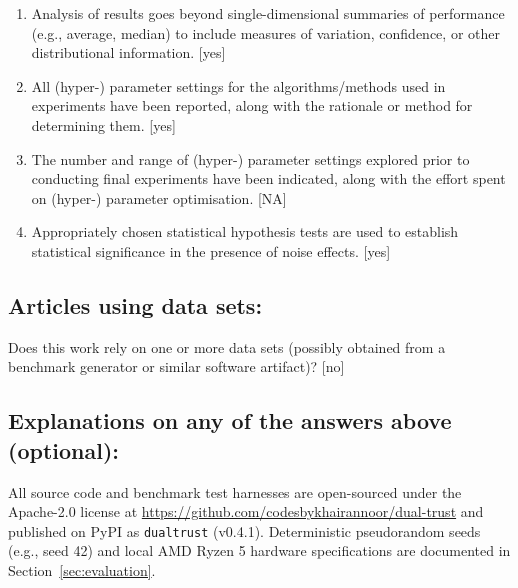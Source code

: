 \documentclass[manuscript, screen, review]{jair}
\begin{document}
\begin{enumerate}
    [yes]
    \item Analysis of results goes beyond single-dimensional summaries of performance (e.g., average, median) to include measures of variation, confidence, or other distributional information. 
    [yes]
    \item All (hyper-) parameter settings for the algorithms/methods used in experiments have been reported, along with the rationale or method for determining them. 
    [yes]
    \item The number and range of (hyper-) parameter settings explored prior to conducting final experiments have been indicated, along with the effort spent on (hyper-) parameter optimisation. 
    [NA]
    \item Appropriately chosen statistical hypothesis tests are used to establish statistical significance in the presence of noise effects.
    [yes]
\end{enumerate}

\subsection*{Articles using data sets:}
Does this work rely on one or more data sets (possibly obtained from a benchmark generator or similar software artifact)? 
[no]

\subsection*{Explanations on any of the answers above (optional):}
All source code and benchmark test harnesses are open-sourced under the Apache-2.0 license at \url{https://github.com/codesbykhairannoor/dual-trust} and published on PyPI as \texttt{dualtrust} (v0.4.1). Deterministic pseudorandom seeds (e.g., seed 42) and local AMD Ryzen 5 hardware specifications are documented in Section~\ref{sec:evaluation}.
\end{document}
